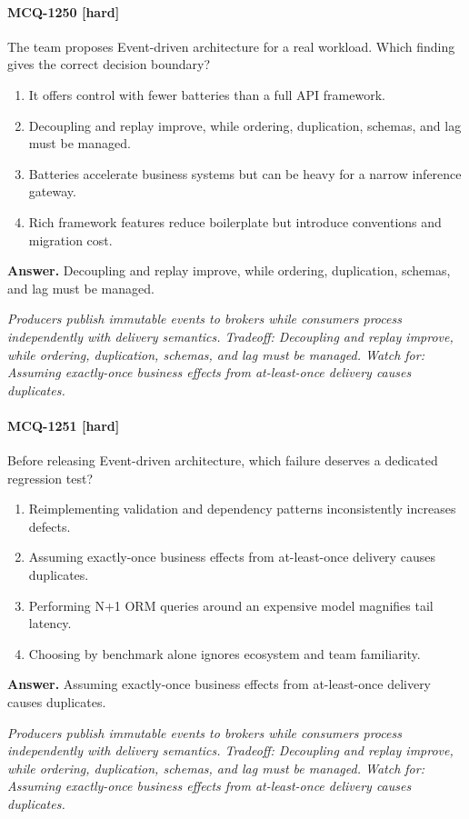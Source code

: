 \paragraph{MCQ-1250 [hard]} The team proposes Event-driven architecture for a real workload. Which finding gives the correct decision boundary?
\begin{enumerate}[label=\Alph*.]
\item It offers control with fewer batteries than a full API framework.
\item Decoupling and replay improve, while ordering, duplication, schemas, and lag must be managed.
\item Batteries accelerate business systems but can be heavy for a narrow inference gateway.
\item Rich framework features reduce boilerplate but introduce conventions and migration cost.
\end{enumerate}
\noindent\textbf{Answer.} Decoupling and replay improve, while ordering, duplication, schemas, and lag must be managed.
\par\textit{Producers publish immutable events to brokers while consumers process independently with delivery semantics. Tradeoff: Decoupling and replay improve, while ordering, duplication, schemas, and lag must be managed. Watch for: Assuming exactly-once business effects from at-least-once delivery causes duplicates.}
\paragraph{MCQ-1251 [hard]} Before releasing Event-driven architecture, which failure deserves a dedicated regression test?
\begin{enumerate}[label=\Alph*.]
\item Reimplementing validation and dependency patterns inconsistently increases defects.
\item Assuming exactly-once business effects from at-least-once delivery causes duplicates.
\item Performing N+1 ORM queries around an expensive model magnifies tail latency.
\item Choosing by benchmark alone ignores ecosystem and team familiarity.
\end{enumerate}
\noindent\textbf{Answer.} Assuming exactly-once business effects from at-least-once delivery causes duplicates.
\par\textit{Producers publish immutable events to brokers while consumers process independently with delivery semantics. Tradeoff: Decoupling and replay improve, while ordering, duplication, schemas, and lag must be managed. Watch for: Assuming exactly-once business effects from at-least-once delivery causes duplicates.}
